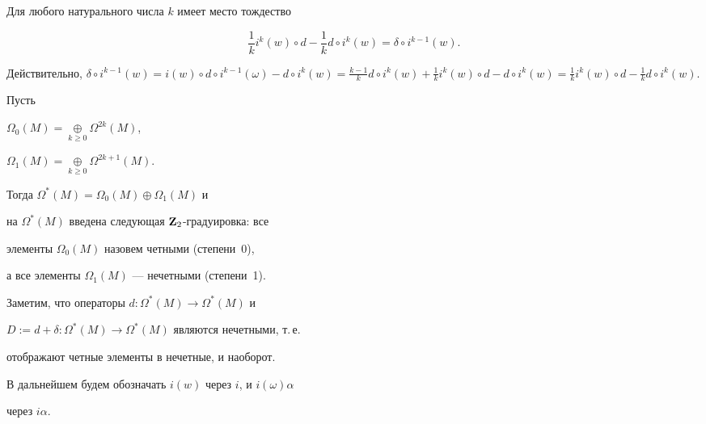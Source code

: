 \begin{cors}


Для любого натурального числа $k$ имеет место тождество


\begin{equation}


\label{id_delta}


\frac1k i^k(w) \circ d - \frac1k d\circ i^{k}(w) =


\delta\circ i^{k-1}(w).


\end{equation}


\end{cors}








\begin{pf}


Действительно, $\delta\circ i^{k-1}(w) = i(w)\circ d\circ i^{k-1}(\omega) -


d\circ i^k(w) = \frac{k-1}{k}d\circ i^{k}(w)+\frac1k i^k(w)\circ d


-d\circ i^k(w) = \frac1k i^k(w) \circ d - \frac1k d\circ i^{k}(w)$.


\end{pf}





Пусть


$\Omega_0(M)=\mathop{\oplus}\limits_{k\ge0}\Omega^{2k}(M)$,


$\Omega_1(M)=\mathop{\oplus}\limits_{k\ge0}\Omega^{2k+1}(M)$.


Тогда $\Omega^*(M)=\Omega_0(M)\oplus\Omega_1(M)$ и


на $\Omega^*(M)$ введена следующая $\bold Z_2$-градуировка: все


элементы $\Omega_0(M)$ назовем четными (степени~0),


а все элементы $\Omega_1(M)$ --- нечетными (степени~1).


Заметим, что операторы $d:\Omega^*(M)\to\Omega^*(M)$ и


$D:=d+\delta:\Omega^*(M)\to\Omega^*(M)$ являются нечетными, т.\,е.


отображают четные элементы в нечетные, и наоборот.





В дальнейшем будем обозначать $i(w)$ через $i$, и $i(\omega)\alpha$


через $i\alpha$.


